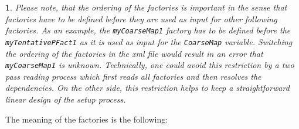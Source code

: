 \documentclass[10pt,fleqn]{book}
\newtheorem*{mycomment}{\ding{42}}
\begin{document}
\begin{mycomment}
Please note, that the ordering of the factories is important in the sense that factories have to be defined before they are used as input
for other following factories. As an example, the \texttt{myCoarseMap1} factory has to be defined before the \texttt{myTentativePFact1} as it is used as input for the \texttt{CoarseMap} variable. Switching the ordering of the factories in the xml file would result in an error that \texttt{myCoarseMap1} is unknown. Technically, one could avoid this restriction by a two pass reading process which first reads all factories and then resolves the dependencies. On the other side, this restriction helps to keep a straightforward linear design of the setup process.
\end{mycomment}

\noindent The meaning of the factories is the following:\smallskip
\end{document}
